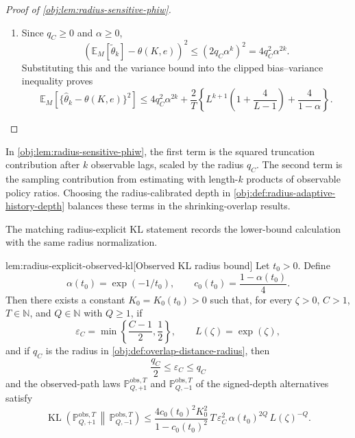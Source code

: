 \documentclass[11pt]{article}
\begin{document}
\begin{proof}[Proof of \cref{obj:lem:radius-sensitive-phiw}]
\begin{enumerate}
\item
Since \(q_C\ge 0\) and \(\alpha\ge 0\),
\[
\left(
\mathbb E_M[\widetilde\theta_k]-\theta(K,e)
\right)^2
\le
(2q_C\alpha^k)^2
=
4q_C^2\alpha^{2k}.
\]
Substituting this and the variance bound into the clipped bias--variance inequality proves
\[
\mathbb E_M\!\left[\{\widehat\theta_k-\theta(K,e)\}^2\right]
\le
4q_C^2\alpha^{2k}
+\frac{2}{T}\left\{
L^{k+1}\left(1+\frac{4}{L-1}\right)
+\frac{4}{1-\alpha}
\right\}.
\] %
\end{enumerate}
\end{proof}

In \cref{obj:lem:radius-sensitive-phiw}, the first term is the squared truncation contribution after \(k\) observable lags, scaled by the radius \(q_C\). The second term is the sampling contribution from estimating with length-\(k\) products of observable policy ratios. Choosing the radius-calibrated depth in \cref{obj:def:radius-adaptive-history-depth} balances these terms in the shrinking-overlap results.

The matching radius-explicit KL statement records the lower-bound calculation with the same radius normalization.

\begin{lemmav}{lem:radius-explicit-observed-kl}[Observed KL radius bound]
Let \(t_0>0\).  Define
\[
\alpha(t_0)=\exp(-1/t_0),\qquad
c_0(t_0)=\frac{1-\alpha(t_0)}{4}.
\]
Then there exists a constant \(K_0=K_0(t_0)>0\) such that, for every \(\zeta>0\), \(C>1\), \(T\in\mathbb N\), and \(Q\in\mathbb N\) with \(Q\ge1\), if
\[
\varepsilon_C=\min\left\{\frac{C-1}{2},\frac12\right\},\qquad
L(\zeta)=\exp(\zeta),
\]
and if \(q_C\) is the radius in \cref{obj:def:overlap-distance-radius}, then
\[
\frac{q_C}{2}\le \varepsilon_C \le q_C
\]
and the observed-path laws \(\mathbb P_{Q,+1}^{\mathrm{obs},T}\) and
\(\mathbb P_{Q,-1}^{\mathrm{obs},T}\) of the signed-depth alternatives satisfy
\[
\operatorname{KL}\!\left(
\mathbb P_{Q,+1}^{\mathrm{obs},T}\,\middle\|\,
\mathbb P_{Q,-1}^{\mathrm{obs},T}
\right)
\le
\frac{4c_0(t_0)^2K_0^2}{1-c_0(t_0)^2}\,
T\,\varepsilon_C^2\,\alpha(t_0)^{2Q}\,L(\zeta)^{-Q}.
\]
\end{lemmav}
\end{document}
